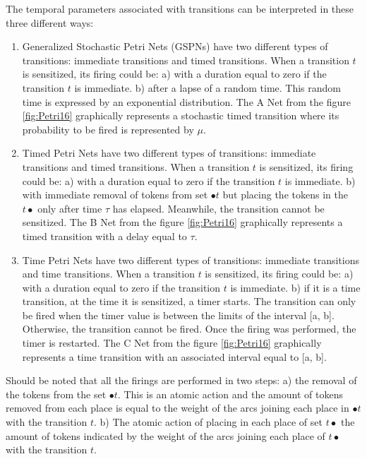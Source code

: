 	The temporal parameters associated with transitions can be interpreted in these three different ways\footnotemark:
	\begin{enumerate}
		\item Generalized Stochastic Petri Nets (GSPNs) \cite{domeika} have two different types of 
		transitions: immediate transitions and timed transitions. When a transition $t$ is sensitized,
		its firing could be: 
		a) with a duration equal to zero if the transition $t$ is immediate. 
		b) after a lapse of a random time. This random time is expressed by an exponential 
		distribution. The A Net from the figure \ref{fig:Petri16} graphically represents a stochastic timed 
		transition where its probability to be fired is represented by $\mu$.\\
		
		\item Timed Petri Nets have two different types of transitions: immediate transitions and 
		timed transitions. When a transition $t$ is sensitized, its firing could be: 
		a) with a duration equal to zero if the transition $t$ is immediate. 
		b) with immediate removal of tokens from set $\bullet t$ but placing the tokens in the $t\bullet$ 
		only after time $\tau$ has elapsed. Meanwhile, the transition cannot be sensitized. The B Net from the 
		figure \ref{fig:Petri16} graphically represents a timed transition with a delay equal to $\tau$.\\
			
		\item Time Petri Nets have two different types of transitions: immediate transitions and time
		 transitions. When a transition $t$ is sensitized, its firing could be: 
		 a) with a duration equal to zero if the transition $t$ is immediate. 
		 b) if it is a time transition, at the time it is sensitized, a timer starts. The transition 
		 can only be fired when the timer value is between the limits of the interval [a, b]. 
		 Otherwise, the transition cannot be fired. Once the firing was performed, the timer is 
		 restarted. The C Net from the figure \ref{fig:Petri16} graphically represents a time 
		 transition with an associated interval equal to [a, b].\\
	\end{enumerate}
	
	Should be noted that all the firings are performed in two steps: 
	a) the removal of the tokens from the set $\bullet t$. This is an atomic action and the amount 
	of tokens removed from each place is equal to the weight of the arcs joining each place in 
	$\bullet t$ with the transition $t$. b) The atomic action of placing in each place of set $t \bullet$  
	the amount of tokens indicated by the weight of the arcs joining each place of $t \bullet$ with 
	the transition $t$.